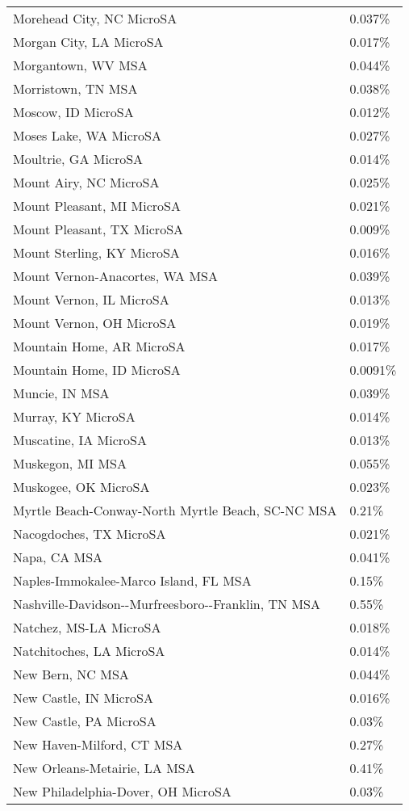 \begin{longtable}[]{@{}ll@{}}
Morehead City, NC MicroSA & 0.037\% \\
Morgan City, LA MicroSA & 0.017\% \\
Morgantown, WV MSA & 0.044\% \\
Morristown, TN MSA & 0.038\% \\
Moscow, ID MicroSA & 0.012\% \\
Moses Lake, WA MicroSA & 0.027\% \\
Moultrie, GA MicroSA & 0.014\% \\
Mount Airy, NC MicroSA & 0.025\% \\
Mount Pleasant, MI MicroSA & 0.021\% \\
Mount Pleasant, TX MicroSA & 0.009\% \\
Mount Sterling, KY MicroSA & 0.016\% \\
Mount Vernon-Anacortes, WA MSA & 0.039\% \\
Mount Vernon, IL MicroSA & 0.013\% \\
Mount Vernon, OH MicroSA & 0.019\% \\
Mountain Home, AR MicroSA & 0.017\% \\
Mountain Home, ID MicroSA & 0.0091\% \\
Muncie, IN MSA & 0.039\% \\
Murray, KY MicroSA & 0.014\% \\
Muscatine, IA MicroSA & 0.013\% \\
Muskegon, MI MSA & 0.055\% \\
Muskogee, OK MicroSA & 0.023\% \\
Myrtle Beach-Conway-North Myrtle Beach, SC-NC MSA & 0.21\% \\
Nacogdoches, TX MicroSA & 0.021\% \\
Napa, CA MSA & 0.041\% \\
Naples-Immokalee-Marco Island, FL MSA & 0.15\% \\
Nashville-Davidson-\/-Murfreesboro-\/-Franklin, TN MSA & 0.55\% \\
Natchez, MS-LA MicroSA & 0.018\% \\
Natchitoches, LA MicroSA & 0.014\% \\
New Bern, NC MSA & 0.044\% \\
New Castle, IN MicroSA & 0.016\% \\
New Castle, PA MicroSA & 0.03\% \\
New Haven-Milford, CT MSA & 0.27\% \\
New Orleans-Metairie, LA MSA & 0.41\% \\
New Philadelphia-Dover, OH MicroSA & 0.03\% \\

\end{longtable}
